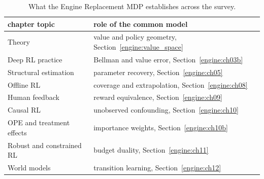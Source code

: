 \begin{table}[h]
\centering
\caption{What the Engine Replacement MDP establishes across the survey.}
\label{tab:engine_recap}
\begin{tabular}{p{}p{}}
\hline
chapter topic & role of the common model \\
\hline
Theory & value and policy geometry, Section~\ref{engine:value_space} \\
Deep RL practice & Bellman and value error, Section~\ref{engine:ch03b} \\
Structural estimation & parameter recovery, Section~\ref{engine:ch05} \\
Offline RL & coverage and extrapolation, Section~\ref{engine:ch08} \\
Human feedback & reward equivalence, Section~\ref{engine:ch09} \\
Causal RL & unobserved confounding, Section~\ref{engine:ch10} \\
OPE and treatment effects & importance weights, Section~\ref{engine:ch10b} \\
Robust and constrained RL & budget duality, Section~\ref{engine:ch11} \\
World models & transition learning, Section~\ref{engine:ch12} \\
\hline
\end{tabular}
\end{table}
